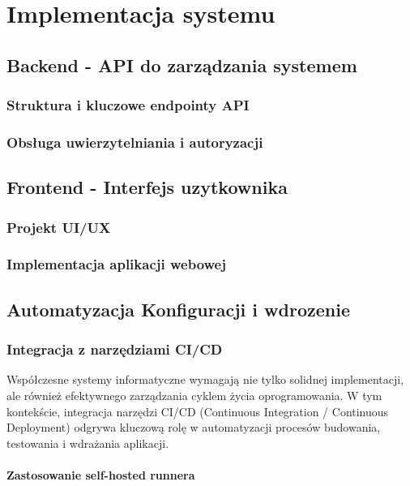 \chapter{Implementacja systemu}

\section{Backend - API do zarządzania systemem}

\subsection{Struktura i kluczowe endpointy API}

\subsection{Obsługa uwierzytelniania i autoryzacji}

\section{Frontend - Interfejs uzytkownika}

\subsection{Projekt UI/UX}

\subsection{Implementacja aplikacji webowej}

\section{Automatyzacja Konfiguracji i wdrozenie}

\subsection{Integracja z narzędziami CI/CD}
\label{sec:integracja_ci_cd}

Współczesne systemy informatyczne wymagają nie tylko solidnej implementacji, ale również efektywnego zarządzania cyklem życia oprogramowania. W tym kontekście, integracja narzędzi CI/CD (Continuous Integration / Continuous Deployment) odgrywa kluczową rolę w automatyzacji procesów budowania, testowania i wdrażania aplikacji.

\subsubsection{Zastosowanie self-hosted runnera}

